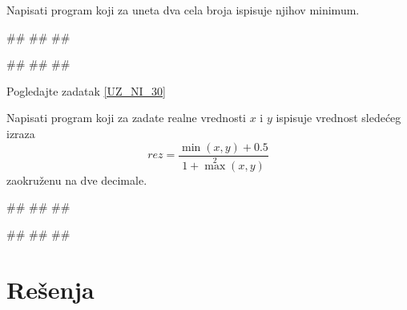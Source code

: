 \begin{Exercise}[label=UZ_NI_31]
Napisati program koji za uneta dva cela broja ispisuje njihov minimum. 

\begin{miditest}
\begin{upotreba}{1}
#\naslovInt#
##
##
\end{upotreba}
\end{miditest}
\begin{miditest}
\begin{upotreba}{2}
#\naslovInt#
##
##
\end{upotreba}
\end{miditest}

\end{Exercise}
\ifresenja
\begin{Answer}[ref=UZ_NI_31]
Pogledajte zadatak \ref{UZ_NI_30}
\end{Answer}
\fi


\begin{Exercise}[label=UZ_NI_32]
Napisati program koji za zadate realne vrednosti $x$ i $y$ ispisuje vrednost sledećeg izraza
$$rez = \frac{\min(x, y) + 0.5}{1 + \max^2(x, y)}$$ zaokruženu na dve decimale. 

\begin{miditest}
\begin{upotreba}{1}
#\naslovInt#
##
##
\end{upotreba}
\end{miditest}
\begin{miditest}
\begin{upotreba}{1}
#\naslovInt#
##
##
\end{upotreba}
\end{miditest}

\end{Exercise}
\ifresenja
\begin{Answer}[ref=UZ_NI_32]
\end{Answer}
\fi


\ifresenja
\sstrana
\section{Rešenja}
\shipoutAnswer
\fi

